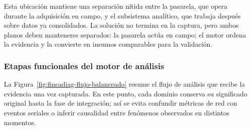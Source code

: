 Esta ubicación mantiene una separación nítida entre la pasarela, que opera durante la adquisición en campo, y el subsistema analítico, que trabaja después sobre datos ya consolidados. La solución no termina en la captura, pero ambos planos deben mantenerse separados: la pasarela actúa en campo; el motor ordena la evidencia y la convierte en insumos comparables para la validación.

\subsubsection{Etapas funcionales del motor de análisis}
La Figura~\ref{fig:fincadiag-flujo-balanceado} resume el flujo de análisis que recibe la evidencia una vez capturada. En este punto, cada dominio conserva su significado original hasta la fase de integración; así se evita confundir métricas de red con eventos seriales o inferir causalidad entre fenómenos observados en distintos momentos.


